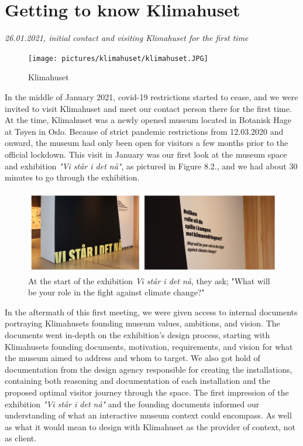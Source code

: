 \section{Getting to know Klimahuset}
\par
\emph{26.01.2021, initial contact and visiting Klimahuset for the first time}
\par

\begin{figure}[H]
\centering
\texttt{[image: pictures/klimahuset/klimahuset.JPG]}
\caption{Klimahuset}
\end{figure}

In the middle of January 2021, covid-19 restrictions started to cease, and we were invited to visit Klimahuset and meet our contact person there for the first time. At the time, Klimahuset was a newly opened museum located in Botanisk Hage at Tøyen in Oslo. Because of strict pandemic restrictions from 12.03.2020 and onward, the museum had only been open for visitors a few months prior to the official lockdown. This visit in January was our first look at the museum space and exhibition \emph{"Vi står i det nå"}, as pictured in Figure 8.2., and we had about 30 minutes to go through the exhibition.

\begin{figure}[H]
\centering
\includegraphics[width=12.5cm]{pictures/process/staar_i_det_naa.png}
\caption{At the start of the exhibition \emph{Vi står i det nå}, they ask; "What will be your role in the fight against climate change?"}

\end{figure}

In the aftermath of this first meeting, we were given access to internal documents portraying Klimahusets founding museum values, ambitions, and vision. The documents went in-depth on the exhibition's design process, starting with Klimahusets founding documents, motivation, requirements, and vision for what the museum aimed to address and whom to target. We also got hold of documentation from the design agency responsible for creating the installations, containing both reasoning and documentation of each installation and the proposed optimal visitor journey through the space. The first impression of the exhibition \emph{"Vi står i det nå"} and the founding documents informed our understanding of what an interactive museum context could encompass. As well as what it would mean to design with Klimahuset as the provider of context, not as client.

